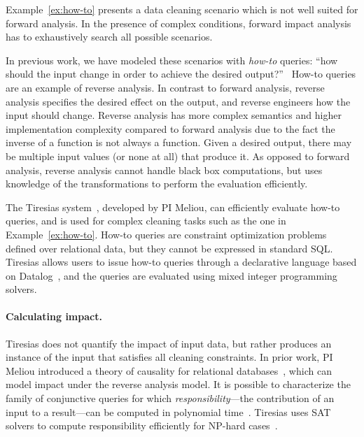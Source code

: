 Example~\ref{ex:how-to} presents a data cleaning scenario which is not
well suited for forward analysis. In the presence of complex
conditions, forward impact analysis has to exhaustively search all
possible scenarios.

In previous work, we have modeled these scenarios with \emph{how-to}
queries: ``how should the input change in order to achieve the desired
output?''~\cite{DBLP:journals/pvldb/MeliouGS11} How-to queries are an
example of reverse analysis. In contrast to forward analysis,
reverse analysis specifies the desired effect on the output, and
reverse engineers how the input should change. Reverse analysis has
more complex semantics and higher implementation complexity compared
to forward analysis due to the fact the inverse of a function is not
always a function. Given a desired output, there may be multiple input
values (or none at all) that produce it.  As opposed to forward
analysis, reverse analysis cannot handle black box computations, but
uses knowledge of the transformations to perform the evaluation
efficiently.



The Tiresias system~\cite{DBLP:conf/sigmod/MeliouS12,
  DBLP:conf/sigmod/MeliouSS12}, developed by PI Meliou, can
efficiently evaluate how-to queries, and is used for complex cleaning
tasks such as the one in Example~\ref{ex:how-to}. How-to queries are
constraint optimization problems defined over relational data, but
they cannot be expressed in standard SQL. Tiresias allows users to
issue how-to queries through a declarative language based on
Datalog~\cite{DBLP:journals/tkde/CeriGT89}, and the queries are
evaluated using mixed integer programming solvers.

\paragraph{Calculating impact.} %
\label{par:calculating_impact}

Tiresias does not quantify the impact of input data, but rather
produces an instance of the input that satisfies all cleaning
constraints. In prior work, PI Meliou introduced a theory of causality
for relational databases~\cite{DBLP:journals/debu/MeliouGHKMS10},
which can model impact under the reverse analysis model. It is
possible to characterize the family of conjunctive queries for which
\emph{responsibility}---the contribution of an input to a result---can
be computed in polynomial
time~\cite{DBLP:journals/pvldb/MeliouGMS11}. Tiresias uses SAT solvers
to compute responsibility efficiently for NP-hard
cases~\cite{DBLP:conf/sigmod/MeliouGNS11}.


